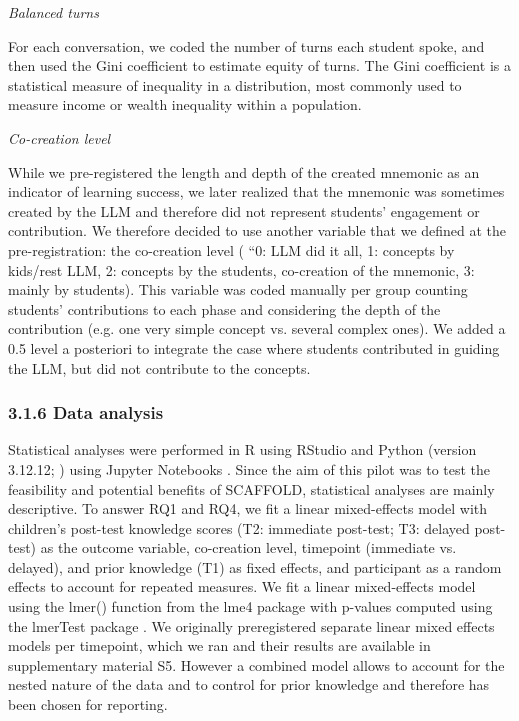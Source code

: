 \documentclass[fleqn,10pt]{wlscirep}
\begin{document}
\textit{Balanced turns}

For each conversation, we coded the number of turns each student spoke, and then used the Gini coefficient to estimate equity of turns. The Gini coefficient \cite{Dixon1987} is a statistical measure of inequality in a distribution, most commonly used to measure income or wealth inequality within a population.

\textit{Co-creation level}

While we pre-registered the length and depth of the created mnemonic as an indicator of learning success, we later realized that the mnemonic was sometimes created by the LLM and therefore did not represent students' engagement or contribution. We therefore decided to use another variable that we defined at the pre-registration: the co-creation level ( ``0: LLM did it all, 1: concepts by kids/rest LLM, 2: concepts by the students, co-creation of the mnemonic, 3: mainly by students). This variable was coded manually per group counting students' contributions to each phase and considering the depth of the contribution (e.g. one very simple concept vs. several complex ones). We added a 0.5 level a posteriori to integrate the case where students contributed in guiding the LLM, but did not contribute to the concepts.

\subsubsection*{3.1.6 Data analysis}

Statistical analyses were performed in R \cite{RCore2020} using RStudio \cite{Posit2025} and Python (version 3.12.12; \cite{Python2021}) using Jupyter Notebooks \cite{Kluyver2016}. Since the aim of this pilot was to test the feasibility and potential benefits of SCAFFOLD, statistical analyses are mainly descriptive. To answer RQ1 and RQ4, we fit a linear mixed-effects model with children's post-test knowledge scores (T2: immediate post-test; T3: delayed post-test) as the outcome variable, co-creation level, timepoint (immediate vs. delayed), and prior knowledge (T1) as fixed effects, and participant as a random effects to account for repeated measures. We fit a linear mixed-effects model using the lmer() function from the lme4 package \cite{Bates2015} with p-values computed using the lmerTest package \cite{Kuznetsova2017}. We originally preregistered separate linear mixed effects models per timepoint, which we ran and their results are available in supplementary material S5. However a combined model allows to account for the nested nature of the data and to control for prior knowledge and therefore has been chosen for reporting.
\end{document}
